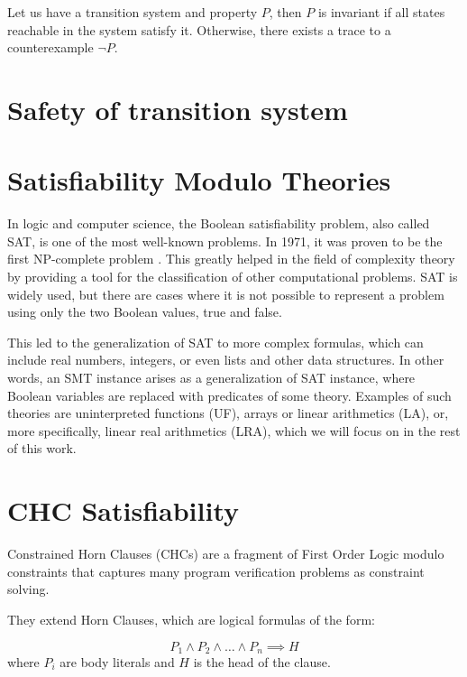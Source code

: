 \vspace{\baselineskip}Let us have a transition system and property $P$, then $P$ is invariant if all states reachable in the system satisfy it. Otherwise, there exists a trace to a counterexample $\neg P$.

\section{Safety of transition system}

\section{Satisfiability Modulo Theories}
\noindent In logic and computer science, the Boolean satisfiability problem,
also called SAT, is one of the most well-known problems. In 1971, it was proven
to be the first NP-complete problem  \cite{10.1145/800157.805047}. This greatly
helped in the field of complexity theory by providing a tool for the
classification of other computational problems. SAT is widely used, but there
are cases where it is not possible to represent a problem using only the two
Boolean values, true and false.

This led to the generalization of SAT to more complex formulas, which can
include real numbers, integers, or even lists and other data structures. In
other words, an SMT instance arises as a generalization of SAT instance, where
Boolean variables are replaced with predicates of some theory. Examples of such
theories are uninterpreted functions (UF), arrays or linear arithmetics (LA),
or, more specifically, linear real arithmetics (LRA), which we will focus on in
the rest of this work.

\section{CHC Satisfiability}
\noindent Constrained Horn Clauses (CHCs) are a fragment of First Order Logic
modulo constraints that captures many program verification problems as
constraint solving.

\vspace{\baselineskip}\noindent
They extend Horn Clauses, which are logical formulas of the form:

\begin{equation}
    P_{1} \land P_{2} \land \dots \land P_{n} \implies H
\end{equation}
where $P_i$ are body literals and $H$ is the head of the clause. 

